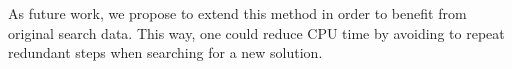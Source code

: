 \documentclass[runningheads]{llncs}
\begin{document}

As future work, we propose to extend this method in order to benefit from original search data. This way, one could reduce CPU time by avoiding to repeat redundant steps when searching for a new solution.

\end{document}

